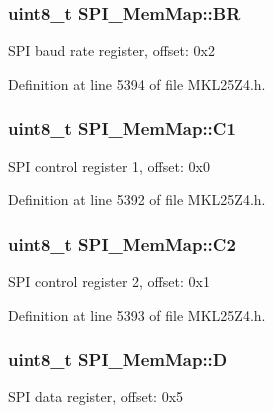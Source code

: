 \subsubsection[{\texorpdfstring{BR}{BR}}]{\setlength{\rightskip}{0pt plus 5cm}uint8\+\_\+t S\+P\+I\+\_\+\+Mem\+Map\+::\+BR}\hypertarget{struct_s_p_i___mem_map_ad2c201cf5aa72904503df243610507b8}{}\label{struct_s_p_i___mem_map_ad2c201cf5aa72904503df243610507b8}
S\+PI baud rate register, offset\+: 0x2 

Definition at line 5394 of file M\+K\+L25\+Z4.\+h.

\subsubsection[{\texorpdfstring{C1}{C1}}]{\setlength{\rightskip}{0pt plus 5cm}uint8\+\_\+t S\+P\+I\+\_\+\+Mem\+Map\+::\+C1}\hypertarget{struct_s_p_i___mem_map_ab9f017bddfa72e299d9c0ab7ab400c1b}{}\label{struct_s_p_i___mem_map_ab9f017bddfa72e299d9c0ab7ab400c1b}
S\+PI control register 1, offset\+: 0x0 

Definition at line 5392 of file M\+K\+L25\+Z4.\+h.

\subsubsection[{\texorpdfstring{C2}{C2}}]{\setlength{\rightskip}{0pt plus 5cm}uint8\+\_\+t S\+P\+I\+\_\+\+Mem\+Map\+::\+C2}\hypertarget{struct_s_p_i___mem_map_aae7ca381054324cf98aac30ce607046a}{}\label{struct_s_p_i___mem_map_aae7ca381054324cf98aac30ce607046a}
S\+PI control register 2, offset\+: 0x1 

Definition at line 5393 of file M\+K\+L25\+Z4.\+h.

\subsubsection[{\texorpdfstring{D}{D}}]{\setlength{\rightskip}{0pt plus 5cm}uint8\+\_\+t S\+P\+I\+\_\+\+Mem\+Map\+::D}\hypertarget{struct_s_p_i___mem_map_aa940ca36df1b702c6c03557f442cde16}{}\label{struct_s_p_i___mem_map_aa940ca36df1b702c6c03557f442cde16}
S\+PI data register, offset\+: 0x5 

